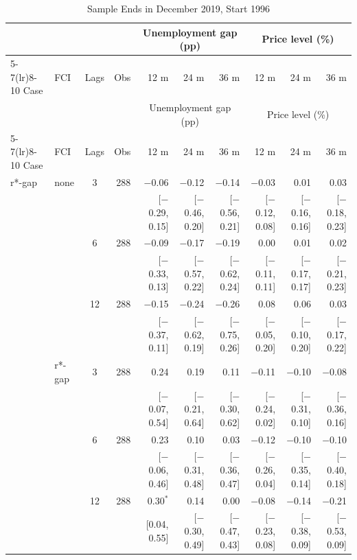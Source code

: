 \begingroup\scriptsize\setlength{\tabcolsep}{0.9pt}
\begin{longtable}{llcrrrrrrr}
\caption{Sample Ends in December 2019, Start 1996}\label{tab:appR1c}\\
\toprule
 & & & & \multicolumn{3}{c}{Unemployment gap (pp)} & \multicolumn{3}{c}{Price level (\%)}\\ \cmidrule(lr){5-7}\cmidrule(lr){8-10}
Case & FCI & Lags & Obs & 12 m & 24 m & 36 m & 12 m & 24 m & 36 m\\
\midrule\endfirsthead
\toprule
 & & & & \multicolumn{3}{c}{Unemployment gap (pp)} & \multicolumn{3}{c}{Price level (\%)}\\ \cmidrule(lr){5-7}\cmidrule(lr){8-10}
Case & FCI & Lags & Obs & 12 m & 24 m & 36 m & 12 m & 24 m & 36 m\\
\midrule\endhead
\bottomrule\endfoot
r*-gap & none & 3 & 288 & $-$0.06 & $-$0.12 & $-$0.14 & $-$0.03 & 0.01 & 0.03\\
 & & & & {\scriptsize [$-$0.29, 0.15]} & {\scriptsize [$-$0.46, 0.20]} & {\scriptsize [$-$0.56, 0.21]} & {\scriptsize [$-$0.12, 0.08]} & {\scriptsize [$-$0.16, 0.16]} & {\scriptsize [$-$0.18, 0.23]}\\
 &  & 6 & 288 & $-$0.09 & $-$0.17 & $-$0.19 & 0.00 & 0.01 & 0.02\\
 & & & & {\scriptsize [$-$0.33, 0.13]} & {\scriptsize [$-$0.57, 0.22]} & {\scriptsize [$-$0.62, 0.24]} & {\scriptsize [$-$0.11, 0.11]} & {\scriptsize [$-$0.17, 0.17]} & {\scriptsize [$-$0.21, 0.23]}\\
 &  & 12 & 288 & $-$0.15 & $-$0.24 & $-$0.26 & 0.08 & 0.06 & 0.03\\
 & & & & {\scriptsize [$-$0.37, 0.11]} & {\scriptsize [$-$0.62, 0.19]} & {\scriptsize [$-$0.75, 0.26]} & {\scriptsize [$-$0.05, 0.20]} & {\scriptsize [$-$0.10, 0.20]} & {\scriptsize [$-$0.17, 0.22]}\\
 & r*-gap & 3 & 288 & 0.24 & 0.19 & 0.11 & $-$0.11 & $-$0.10 & $-$0.08\\
 & & & & {\scriptsize [$-$0.07, 0.54]} & {\scriptsize [$-$0.21, 0.64]} & {\scriptsize [$-$0.30, 0.62]} & {\scriptsize [$-$0.24, 0.02]} & {\scriptsize [$-$0.31, 0.10]} & {\scriptsize [$-$0.36, 0.16]}\\
 &  & 6 & 288 & 0.23 & 0.10 & 0.03 & $-$0.12 & $-$0.10 & $-$0.10\\
 & & & & {\scriptsize [$-$0.06, 0.46]} & {\scriptsize [$-$0.31, 0.48]} & {\scriptsize [$-$0.36, 0.47]} & {\scriptsize [$-$0.26, 0.04]} & {\scriptsize [$-$0.35, 0.14]} & {\scriptsize [$-$0.40, 0.18]}\\
 &  & 12 & 288 & 0.30$^{*}$ & 0.14 & 0.00 & $-$0.08 & $-$0.14 & $-$0.21\\
 & & & & {\scriptsize [0.04, 0.55]} & {\scriptsize [$-$0.30, 0.49]} & {\scriptsize [$-$0.47, 0.43]} & {\scriptsize [$-$0.23, 0.08]} & {\scriptsize [$-$0.38, 0.09]} & {\scriptsize [$-$0.53, 0.09]}\\
\end{longtable}
